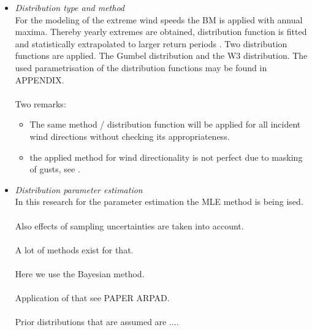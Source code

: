 \begin{itemize}
\item
\textit{Distribution type and method}\\
For the modeling of the extreme wind speeds the BM is applied with annual maxima. Thereby yearly extremes are obtained, distribution function is fitted and statistically extrapolated to larger return periods . Two distribution functions are applied. The Gumbel distribution and the W3 distribution. The used parametrisation of the distribution functions may be found in APPENDIX. \\
\\
Two remarks:
\begin{itemize}
\item The same method / distribution function will be applied for all incident wind directions without checking its appropriateness.
\item the applied method for wind directionality is not perfect due to masking of gusts, see \cite{Moriarty_DIRECTIONALITY}. 
\end{itemize}

\item 
\textit{Distribution parameter estimation}\\
In this research for the parameter estimation the MLE method is being ised. \\
\\
Also effects of sampling uncertainties are taken into account. \\
\\
A lot of methods exist for that.\\
\\
Here we use the Bayesian method. \\
\\
Application of that see PAPER ARPAD.\\
\\
Prior distributions that are assumed are ....
\end{itemize}


